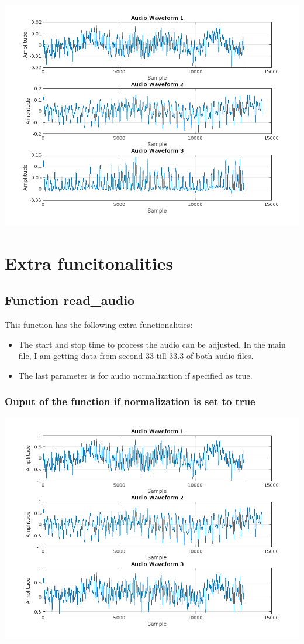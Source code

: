 \documentclass[a4paper,12pt]{article}
\begin{document}
\includegraphics[width=\textwidth]{rendered/audio_result_no_normalize.png}

\section{Extra funcitonalities}

\subsection{Function read\_audio}

This function has the following extra functionalities:
\begin{itemize}
  \item The start and stop time to process the audio can be adjusted. In the main file, I am getting data from second 33 till 33.3 of both audio files.
  \item The last parameter is for audio normalization if specified as true.
\end{itemize}

\subsubsection*{Ouput of the function if normalization is set to true}
\includegraphics[width=\textwidth]{rendered/audio_result_normalized.png}
\end{document}
